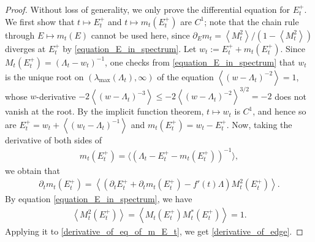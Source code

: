 \documentclass[10pt,reqno]{amsart}
\numberwithin{equation}{section}
\numberwithin{figure}{section}
\theoremstyle{plain} %
\theoremstyle{definition} %
\newcommand{\p}[1]{({#1})}
\newcommand{\pa}[1]{\left({#1}\right)}
\newcommand{\avga}[1]{\left\langle #1 \right\rangle}
\numberwithin{equation}{section}
\begin{document}
\begin{proof}
    Without loss of generality, we only prove the differential equation for $E_t^+$. We first show that $t\mapsto E_t^+$ and $t\mapsto m_t(E_t^+)$ are $C^1$; note that the chain rule through $E\mapsto m_t(E)$ cannot be used here, since $\partial_E m_t=\avga{M_t^2}/(1-\avga{M_t^2})$ diverges at $E_t^+$ by \eqref{equation_E_in_spectrum}. Let $w_t:=E_t^++m_t(E_t^+)$. Since $M_t(E_t^+)=(\Lambda_t-w_t)^{-1}$, one checks from \eqref{equation_E_in_spectrum} that $w_t$ is the unique root on $(\lambda_{\max}(\Lambda_t),\infty)$ of the equation $\avga{(w-\Lambda_t)^{-2}}=1$, whose $w$-derivative $-2\avga{(w-\Lambda_t)^{-3}}\le -2\avga{(w-\Lambda_t)^{-2}}^{3/2}=-2$ does not vanish at the root. By the implicit function theorem, $t\mapsto w_t$ is $C^1$, and hence so are $E_t^+=w_t+\avga{(w_t-\Lambda_t)^{-1}}$ and $m_t(E_t^+)=w_t-E_t^+$. Now, taking the derivative of both sides of
    \begin{equation}\nonumber
        \begin{aligned}
     m_t\p{E_t^+}=\big\langle\pa{\Lambda_t-E_t^+-m_t\p{E_t^+}}^{-1}\big\rangle,
        \end{aligned}
    \end{equation}
    we obtain that     \begin{equation}\label{derivative_of_eq_of_m_E_t}
        \begin{aligned}
            \partial_t m_t\p{E_t^+}=\avga{\pa{\partial_t E_t^+ +\partial_t m_t\p{E_t^+}-f'\p{t}\Lambda} M_t^2\p{E_t^+}}.
        \end{aligned}
    \end{equation}
    By equation \eqref{equation_E_in_spectrum}, we have
    \begin{equation}\nonumber
        \begin{aligned}
            \avga{M_t^2\p{E_t^+}}=\avga{ M_t\p{E_t^{+}} M_t^*\p{E_t^{+}}}=1.
        \end{aligned}
    \end{equation}
    Applying it to \eqref{derivative_of_eq_of_m_E_t}, we get \eqref{derivative_of_edge}.
\end{proof}
\end{document}
